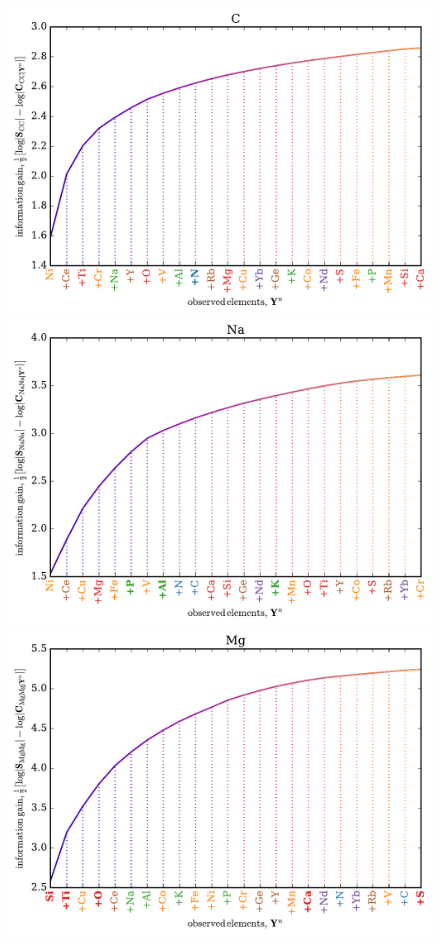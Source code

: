 \documentclass[a4paper,fleqn,usenatbib]{mnras}
\begin{document}
\begin{figure}
	\includegraphics[width=\columnwidth]{apogee_centers_final_29502_spc_win_wid_1p5_c_inf_gain.pdf}
	\includegraphics[width=\columnwidth]{apogee_centers_final_29502_spc_win_wid_1p5_na_inf_gain.pdf}
	\includegraphics[width=\columnwidth]{apogee_centers_final_29502_spc_win_wid_1p5_mg_inf_gain.pdf}

\end{figure}
\end{document}
